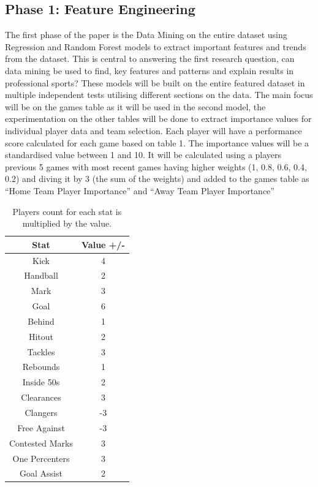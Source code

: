 \documentclass{imc-inf}
\begin{document}
	\subsection{Phase 1: Feature Engineering}
	The first phase of the paper is the Data Mining on the entire dataset using Regression and Random Forest models to extract important features and trends from the dataset. This is central to answering the first research question, can data mining be used to find, key features and patterns and explain results in professional sports?
	These models will be built on the entire featured dataset in multiple independent tests utilising different sections on the data. The main focus will be on the games table as it will be used in the second model, the experimentation on the other tables will be done to extract importance values for individual player data and team selection.
	Each player will have a performance score calculated for each game based on table 1.
	The importance values will be a standardised value between 1 and 10. It will be calculated using a players previous 5 games with most recent games having higher weights (1, 0.8, 0.6, 0.4, 0.2) and diving it by 3 (the sum of the weights) and added to the games table as “Home Team Player Importance” and “Away Team Player Importance”
	\begin{table}[h!]
		\centering	
		\begin{tabular}{| c | c |}
			\hline
			Stat & Value +/- \\
			\hline
			Kick & 4 \\
			\hline
			Handball & 2 \\
			\hline
			Mark & 3 \\
			\hline
			Goal & 6 \\
			\hline
			Behind & 1 \\
			\hline
			Hitout & 2 \\
			\hline
			Tackles & 3 \\
			\hline
			Rebounds & 1 \\
			\hline
			Inside 50s & 2\\
			\hline
			Clearances & 3 \\
			\hline
			Clangers & -3 \\
			\hline
			Free Against & -3 \\
			\hline
			Contested Marks & 3 \\
			\hline
			One Percenters & 3 \\
			\hline
			Goal Assist & 2 \\
			\hline
		\end{tabular}
		\caption{\label {tab:PlayerImportance}Players count for each stat is multiplied by the value.}
		
	\end{table}
	
\end{document}
